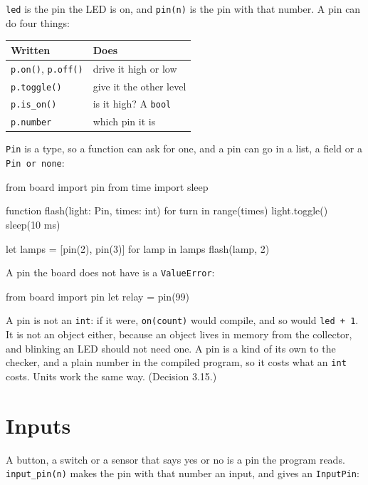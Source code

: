 \verb|led| is the pin the LED is on, and \verb|pin(n)| is the pin with
that number. A pin can do four things:

\begin{center}
\begin{tabular}{ll}
\toprule
Written & Does \\
\midrule
\verb|p.on()|, \verb|p.off()| & drive it high or low \\
\verb|p.toggle()| & give it the other level \\
\verb|p.is_on()| & is it high? A \verb|bool| \\
\verb|p.number| & which pin it is \\
\bottomrule
\end{tabular}
\end{center}

\verb|Pin| is a type, so a function can ask for one, and a pin can go
in a list, a field or a \verb|Pin or none|:

\begin{zeno}
from board import pin
from time import sleep

function flash(light: Pin, times: int) {
    for turn in range(times) {
        light.toggle()
        sleep(10 ms)
    }
}

let lamps = [pin(2), pin(3)]
for lamp in lamps {
    flash(lamp, 2)
}
\end{zeno}

A pin the board does not have is a \verb|ValueError|:

\begin{zeno}[fails=yes]
from board import pin
let relay = pin(99)
\end{zeno}

\begin{why}
A pin is not an \verb|int|: if it were, \verb|on(count)| would
compile, and so would \verb|led + 1|. It is not an object either,
because an object lives in memory from the collector, and blinking an
LED should not need one. A pin is a kind of its own to the checker,
and a plain number in the compiled program, so it costs what an
\verb|int| costs. Units work the same way. (Decision 3.15.)
\end{why}

\section{Inputs}

A button, a switch or a sensor that says yes or no is a pin the
program reads. \verb|input_pin(n)| makes the pin with that number an
input, and gives an \verb|InputPin|:

